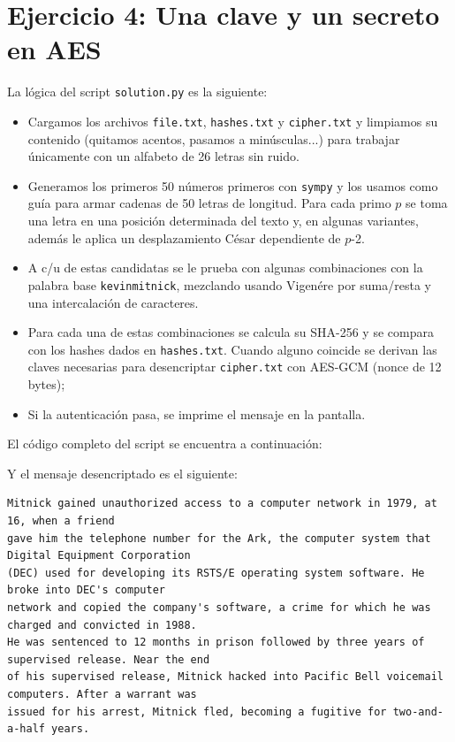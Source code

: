 \section*{Ejercicio 4: Una clave y un secreto en AES}

La lógica del script \texttt{solution.py} es la siguiente: 

\begin{itemize}
	\item Cargamos los archivos \texttt{file.txt}, \texttt{hashes.txt} y \texttt{cipher.txt} y limpiamos su contenido 
	(quitamos acentos, pasamos a minúsculas...) para trabajar únicamente con un alfabeto de 26 letras sin ruido.

	\item Generamos los primeros 50 números primeros con \texttt{sympy} y los usamos como guía para armar cadenas de
	50 letras de longitud. Para cada primo $p$ se toma una letra en una posición determinada del texto y, en algunas variantes, 
	además le aplica un desplazamiento César dependiente de $p$-2.

	\item A c/u de estas candidatas se le prueba con algunas combinaciones con la palabra base \texttt{kevinmitnick}, mezclando usando
	Vigenére por suma/resta y una intercalación de caracteres. 

	\item Para cada una de estas combinaciones se calcula su SHA-256 y se compara con los hashes dados en \texttt{hashes.txt}.
	Cuando alguno coincide se derivan las claves necesarias para desencriptar \texttt{cipher.txt} con AES‑GCM (nonce de 12 bytes); 

	\item Si la autenticación pasa, se imprime el mensaje en la pantalla.
\end{itemize}

El código completo del script se encuentra a continuación:
	


Y el mensaje desencriptado es el siguiente:

\begin{verbatim}
Mitnick gained unauthorized access to a computer network in 1979, at 16, when a friend 
gave him the telephone number for the Ark, the computer system that Digital Equipment Corporation 
(DEC) used for developing its RSTS/E operating system software. He broke into DEC's computer 
network and copied the company's software, a crime for which he was charged and convicted in 1988. 
He was sentenced to 12 months in prison followed by three years of supervised release. Near the end 
of his supervised release, Mitnick hacked into Pacific Bell voicemail computers. After a warrant was 
issued for his arrest, Mitnick fled, becoming a fugitive for two-and-a-half years.
\end{verbatim}

